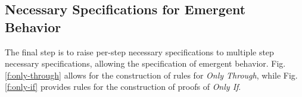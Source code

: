 %
\subsection{Necessary Specifications for Emergent Behavior}
\label{s:emergent-proof}

The final step is to raise per-step necessary specifications to 
multiple step necessary specifications, allowing the specification
of emergent behavior. Fig. \ref{f:only-through} allows for the 
construction of rules for \emph{Only Through}, while Fig. \ref{f:only-if}
provides rules for the construction of proofs of \emph{Only If}.

